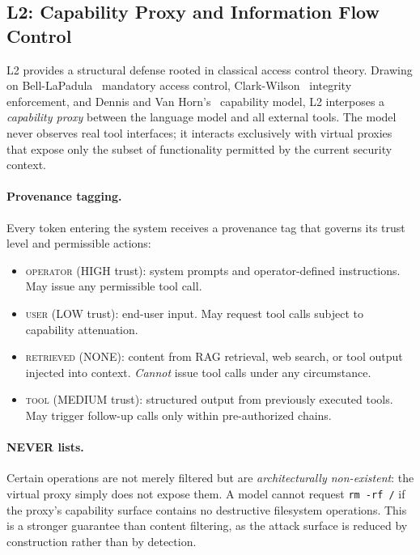 \subsection{L2: Capability Proxy and Information Flow Control}
\label{sec:arch:l2}

L2 provides a structural defense rooted in classical access control theory. Drawing on Bell-LaPadula~\cite{belllapadula1973} mandatory access control, Clark-Wilson~\cite{clarkwilson1987} integrity enforcement, and Dennis and Van Horn's~\cite{dennis1966} capability model, L2 interposes a {\em capability proxy} between the language model and all external tools. The model never observes real tool interfaces; it interacts exclusively with virtual proxies that expose only the subset of functionality permitted by the current security context.

\paragraph{Provenance tagging.} Every token entering the system receives a provenance tag that governs its trust level and permissible actions:

\begin{itemize}[leftmargin=*]
\item \textsc{operator} (HIGH trust): system prompts and operator-defined instructions. May issue any permissible tool call.
\item \textsc{user} (LOW trust): end-user input. May request tool calls subject to capability attenuation.
\item \textsc{retrieved} (NONE): content from RAG retrieval, web search, or tool output injected into context. \emph{Cannot} issue tool calls under any circumstance.
\item \textsc{tool} (MEDIUM trust): structured output from previously executed tools. May trigger follow-up calls only within pre-authorized chains.
\end{itemize}

\paragraph{NEVER lists.} Certain operations are not merely filtered but are {\em architecturally non-existent}: the virtual proxy simply does not expose them. A model cannot request \texttt{rm -rf /} if the proxy's capability surface contains no destructive filesystem operations. This is a stronger guarantee than content filtering, as the attack surface is reduced by construction rather than by detection.

